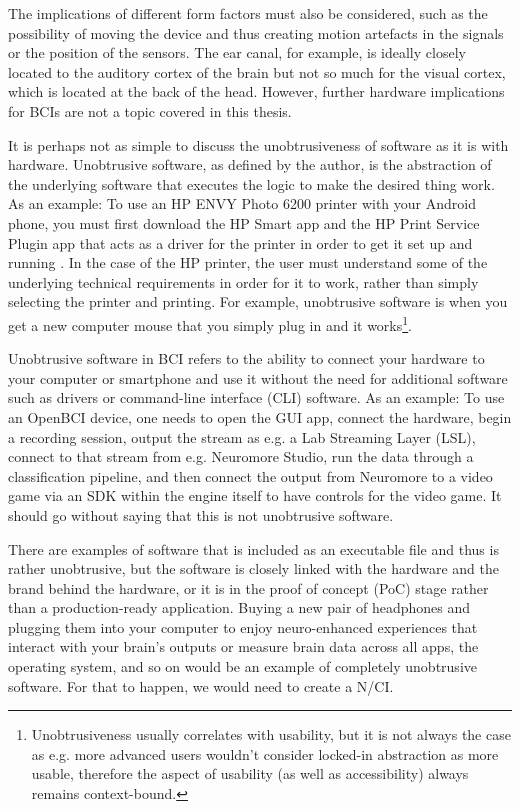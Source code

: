 The implications of different form factors must also be considered, such as the possibility of moving the device and thus creating motion artefacts in the signals or the position of the sensors. The ear canal, for example, is ideally closely located to the auditory cortex of the brain but not so much for the visual cortex, which is located at the back of the head. However, further hardware implications for BCIs are not a topic covered in this thesis.

It is perhaps not as simple to discuss the unobtrusiveness of software as it is with hardware. Unobtrusive software, as defined by the author, is the abstraction of the underlying software that executes the logic to make the desired thing work. As an example: To use an HP ENVY Photo 6200 printer with your Android phone, you must first download the HP Smart app and the HP Print Service Plugin app that acts as a driver for the printer in order to get it set up and running \citep{hp_hp_nodate}. In the case of the HP printer, the user must understand some of the underlying technical requirements in order for it to work, rather than simply selecting the printer and printing. For example, unobtrusive software is when you get a new computer mouse that you simply plug in and it works\footnote{Unobtrusiveness usually correlates with usability, but it is not always the case as e.g. more advanced users wouldn't consider locked-in abstraction as more usable, therefore the aspect of usability (as well as accessibility) always remains context-bound.}.

Unobtrusive software in BCI refers to the ability to connect your hardware to your computer or smartphone and use it without the need for additional software such as drivers or command-line interface (CLI) software. As an example: To use an OpenBCI device, one needs to open the GUI app, connect the hardware, begin a recording session, output the stream as e.g. a Lab Streaming Layer (LSL), connect to that stream from e.g. Neuromore Studio, run the data through a classification pipeline, and then connect the output from Neuromore to a video game via an SDK within the engine itself to have controls for the video game. It should go without saying that this is not unobtrusive software.

There are examples of software that is included as an executable file and thus is rather unobtrusive, but the software is closely linked with the hardware and the brand behind the hardware, or it is in the proof of concept (PoC) stage rather than a production-ready application. Buying a new pair of headphones and plugging them into your computer to enjoy neuro-enhanced experiences that interact with your brain's outputs or measure brain data across all apps, the operating system, and so on would be an example of completely unobtrusive software. For that to happen, we would need to create a N/CI.

